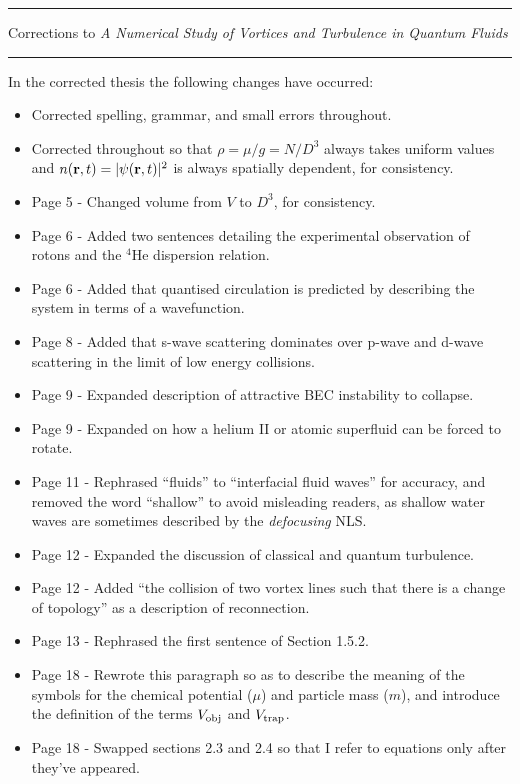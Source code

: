 \documentclass{article}
\begin{document}
\hrule
\vspace{4pt}
Corrections to {\it A Numerical Study of Vortices and Turbulence in Quantum Fluids}\\
\vspace{-1pt}
\hrule

In the corrected thesis the following changes have occurred:

\begin{itemize}
\item Corrected spelling, grammar, and small errors throughout.
\item Corrected throughout so that $\rho = \mu/g = N/D^3$ always takes uniform values and $n({\bf r},t) = |\psi({\bf r},t)|^2$ is always spatially dependent, for consistency.
\item Page 5 -  Changed volume from $V$ to $D^3$, for consistency.
\item Page 6 -  Added two sentences detailing the experimental observation of rotons and the $^4$He dispersion relation.
\item Page 6 -  Added that quantised circulation is predicted by describing the system in terms of a wavefunction.
\item Page 8 -  Added that s-wave scattering dominates over p-wave and d-wave scattering in the limit of low energy collisions.
\item Page 9 -  Expanded description of attractive BEC instability to collapse.
\item Page 9 -  Expanded on how a helium II or atomic superfluid can be forced to rotate.
\item Page 11 - Rephrased ``fluids'' to ``interfacial fluid waves'' for accuracy, and removed the word ``shallow'' to avoid misleading readers, as shallow water waves are sometimes described by the {\it defocusing} NLS. 
\item Page 12 - Expanded the discussion of classical and quantum turbulence.
\item Page 12 - Added ``the collision of two vortex lines such that there is a change of topology'' as a description of reconnection.
\item Page 13 - Rephrased the first sentence of Section 1.5.2.
\item Page 18 - Rewrote this paragraph so as to describe the meaning of the symbols for the chemical potential ($\mu$) and particle mass ($m$), and introduce the definition of the terms $V_{\rm obj}$ and $V_{\rm trap}$.
\item Page 18 - Swapped sections 2.3 and 2.4 so that I refer to equations only after they've appeared.

\end{itemize}
\end{document}
